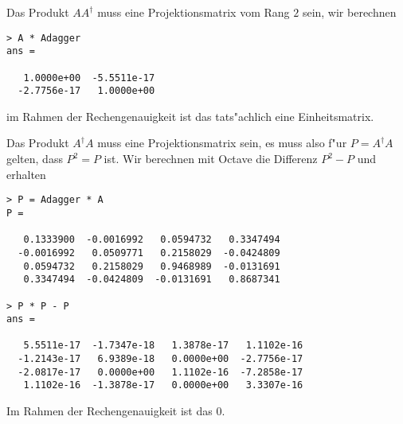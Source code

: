 \begin{beispiel}
\begin{verbatim}
\end{verbatim}
Das Produkt $AA^\dagger$ muss eine Projektionsmatrix vom Rang $2$ sein, wir
berechnen
\begin{verbatim}
> A * Adagger
ans =

   1.0000e+00  -5.5511e-17
  -2.7756e-17   1.0000e+00
\end{verbatim}
im Rahmen der Rechengenauigkeit ist das tats"achlich eine Einheitsmatrix.

Das Produkt $A^\dagger A$ muss eine Projektionsmatrix sein, es muss also
f"ur $P=A^\dagger A$ gelten, dass $P^2=P$ ist.
Wir berechnen mit Octave die Differenz $P^2-P$ und erhalten
\begin{verbatim}
> P = Adagger * A
P =

   0.1333900  -0.0016992   0.0594732   0.3347494
  -0.0016992   0.0509771   0.2158029  -0.0424809
   0.0594732   0.2158029   0.9468989  -0.0131691
   0.3347494  -0.0424809  -0.0131691   0.8687341

> P * P - P
ans =

   5.5511e-17  -1.7347e-18   1.3878e-17   1.1102e-16
  -1.2143e-17   6.9389e-18   0.0000e+00  -2.7756e-17
  -2.0817e-17   0.0000e+00   1.1102e-16  -7.2858e-17
   1.1102e-16  -1.3878e-17   0.0000e+00   3.3307e-16
\end{verbatim}
Im Rahmen der Rechengenauigkeit ist das $0$.
\end{beispiel}
